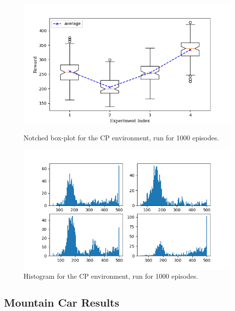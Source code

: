 \documentclass[hidelinks,journal]{IEEEtran}
\begin{document}
\begin{appendices}
\begin{figure}[!h]
  \centering
  \includegraphics[scale=1]{graph/cp4ResBox.png}
  \caption{Notched box-plot for the CP environment, run for 1000 episodes.}
  \includegraphics[scale=1]{graph/cp4ResHist.png}
  \caption{Histogram for the CP environment, run for 1000 episodes.}
\end{figure}

\pagebreak

\subsection{Mountain Car Results}


\end{appendices}
\end{document}
